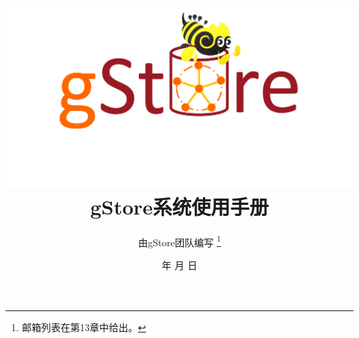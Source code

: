 \documentclass[titlepage, a4paper, 12pt]{article}
\begin{document}


\renewcommand{\contentsname}{目录}
\renewcommand{\listfigurename}{图目录}
\renewcommand{\listtablename}{表目录}
\renewcommand{\partname}{第\thepart部}
\renewcommand{\figurename}{图}
\renewcommand{\tablename}{表}
\renewcommand{\appendixname}{附录}
\renewcommand{\indexname}{索引}
\renewcommand{\abstractname}{摘要}
\renewcommand{\refname}{参考文献}
\renewcommand{\equationautorefname}{公式}
\renewcommand{\footnoteautorefname}{脚注}
\renewcommand{\itemautorefname}{项}
\renewcommand{\figureautorefname}{图}
\renewcommand{\tableautorefname}{表}
\renewcommand{\theoremautorefname}{定理}
\renewcommand{\today}{\number\year 年 \number\month 月 \number\day 日}	


\title{\includegraphics[scale=0.3, bb=0 0 385 567]{logo.png} \\
	gStore系统使用手册}
\author{由gStore团队编写 \footnote{邮箱列表在第13章中给出。}}
\date{\today}
\maketitle
\end{document}
